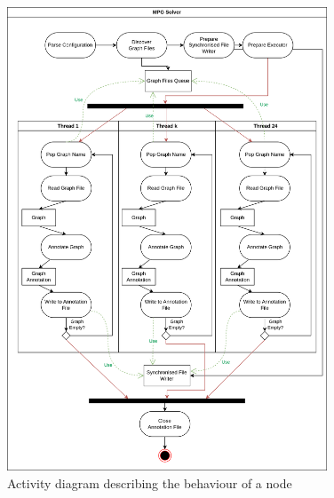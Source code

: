 \begin{figure}
	\centering
	\includegraphics[width=0.85\textwidth]{Figures/AnnotationThreads.png}
	\caption{Activity diagram describing the behaviour of a node
		\label{fig:HPCAnnotationProcess}}
\end{figure}